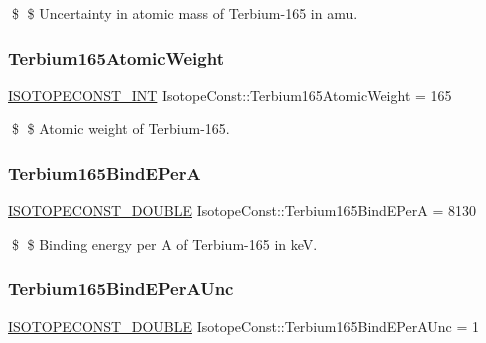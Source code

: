\$ \$ Uncertainty in atomic mass of Terbium-\/165 in amu. \mbox{\label{group___isotope_const-_terbium-_tb165_ga98fcf1ffa651efe6cbe15ef6371fa793}} 
\subsubsection{\texorpdfstring{Terbium165\+Atomic\+Weight}{Terbium165AtomicWeight}}
{\footnotesize\ttfamily \mbox{\hyperlink{group___isotope_const-_macros_ga5f18360b3e99483a35c32d789e62621c}{I\+S\+O\+T\+O\+P\+E\+C\+O\+N\+S\+T\+\_\+\+I\+NT}} Isotope\+Const\+::\+Terbium165\+Atomic\+Weight = 165}

\$ \$ Atomic weight of Terbium-\/165. \mbox{\label{group___isotope_const-_terbium-_tb165_gad69f355caacd7f9ff21160fcd0d41f18}} 
\subsubsection{\texorpdfstring{Terbium165\+Bind\+E\+PerA}{Terbium165BindEPerA}}
{\footnotesize\ttfamily \mbox{\hyperlink{group___isotope_const-_macros_ga8f45a7272ce02c0b4c65c44636ed719a}{I\+S\+O\+T\+O\+P\+E\+C\+O\+N\+S\+T\+\_\+\+D\+O\+U\+B\+LE}} Isotope\+Const\+::\+Terbium165\+Bind\+E\+PerA = 8130}

\$ \$ Binding energy per A of Terbium-\/165 in keV. \mbox{\label{group___isotope_const-_terbium-_tb165_ga033f9ad68747861472de50ee576d3497}} 
\subsubsection{\texorpdfstring{Terbium165\+Bind\+E\+Per\+A\+Unc}{Terbium165BindEPerAUnc}}
{\footnotesize\ttfamily \mbox{\hyperlink{group___isotope_const-_macros_ga8f45a7272ce02c0b4c65c44636ed719a}{I\+S\+O\+T\+O\+P\+E\+C\+O\+N\+S\+T\+\_\+\+D\+O\+U\+B\+LE}} Isotope\+Const\+::\+Terbium165\+Bind\+E\+Per\+A\+Unc = 1}

